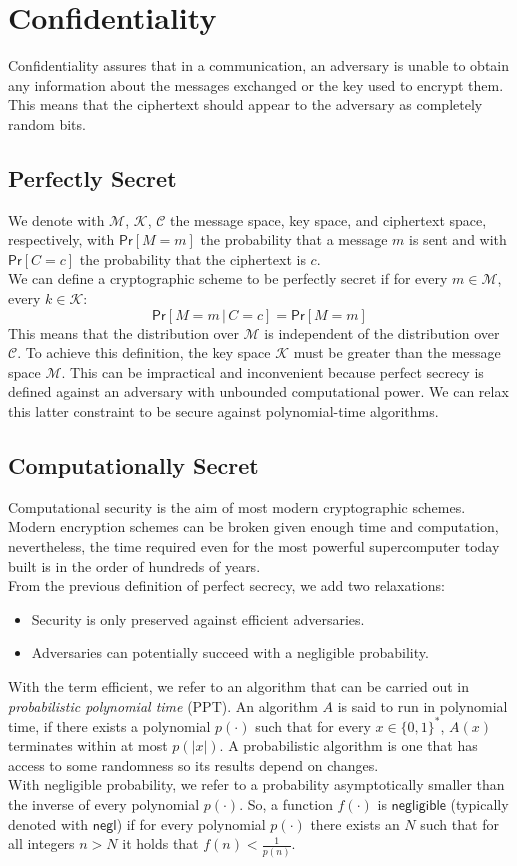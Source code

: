 \section{Confidentiality}
Confidentiality assures that in a communication, an adversary is unable to obtain any information about the messages exchanged or the key used to encrypt them. This means that the ciphertext should appear to the adversary as completely random bits.
\subsection{Perfectly Secret}
We denote with $\mathcal{M}$, $\mathcal{K}$, $\mathcal{C}$ the message space, key space, and ciphertext space, respectively,  with $\mathsf{Pr}[M = m]$ the probability that a message $m$ is sent and with $\mathsf{Pr}[C = c]$ the probability that the ciphertext is $c$.\\
We can define a cryptographic scheme to be perfectly secret if for every $m \in \mathcal{M}$, every $k \in \mathcal{K}$:
$$
    \mathsf{Pr}[M = m \, | \, C = c] = \mathsf{Pr}[M = m]
$$
This means that the distribution over $\mathcal{M}$ is independent of the distribution over $\mathcal{C}$.
To achieve this definition, the key space $\mathcal{K}$ must be greater than the message space $\mathcal{M}$. This can be impractical and inconvenient because perfect secrecy is defined against an adversary with unbounded computational power. We can relax this latter constraint to be secure against polynomial-time algorithms.

\subsection{Computationally Secret}
Computational security is the aim of most modern cryptographic schemes. Modern encryption schemes can be broken given enough time and computation, nevertheless, the time required even for the most powerful supercomputer today built is in the order of hundreds of years.\\
From the previous definition of perfect secrecy, we add two relaxations:
\begin{itemize}
    \item{Security is only preserved against efficient adversaries.}
    \item{Adversaries can potentially succeed with a negligible probability.}
\end{itemize}
With the term efficient, we refer to an algorithm that can be carried out in \emph{probabilistic polynomial time} (PPT). An algorithm $\mathit{A}$ is said to run in polynomial time, if there exists a polynomial $p(\cdot)$ such that for every $x \in \{0, 1\}^*$, $\mathit{A}(x)$ terminates within at most $p(|x|)$. A probabilistic algorithm is one that has access to some randomness so its results depend on changes.\\
With negligible probability, we refer to a probability asymptotically smaller than the inverse of every polynomial $p(\cdot)$.
So, a function $f(\cdot)$ is $\mathsf{negligible}$ (typically denoted with $\mathsf{negl}$) if for every polynomial $p(\cdot)$ there exists an $N$ such that for all integers $n > N$ it holds that $f(n) < \frac{1}{p(n)}$.

